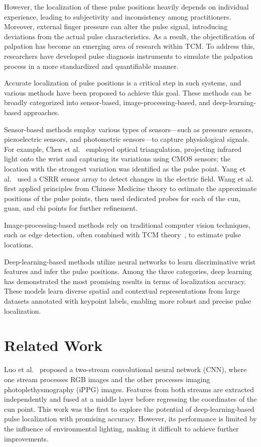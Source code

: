 \documentclass[twocolumn]{article}
\begin{document}
However, the localization of these pulse positions heavily depends on individual experience, leading to subjectivity and inconsistency among practitioners. Moreover, external finger pressure can alter the pulse signal, introducing deviations from the actual pulse characteristics. As a result, the objectification of palpation has become an emerging area of research within TCM. To address this, researchers have developed pulse diagnosis instruments to simulate the palpation process in a more standardized and quantifiable manner.

Accurate localization of pulse positions is a critical step in such systems, and various methods have been proposed to achieve this goal. These methods can be broadly categorized into sensor-based, image-processing-based, and deep-learning-based approaches.

Sensor-based methods employ various types of sensors—such as pressure sensors, piezoelectric sensors, and photometric sensors—to capture physiological signals. For example, Chen et al.~\cite{chen2015} employed optical triangulation, projecting infrared light onto the wrist and capturing its variations using CMOS sensors; the location with the strongest variation was identified as the pulse point. Yang et al.~\cite{yang2017} used a CSRR sensor array to detect changes in the electric field. Wang et al.~\cite{wang2014} first applied principles from Chinese Medicine theory to estimate the approximate positions of the pulse points, then used dedicated probes for each of the cun, guan, and chi points for further refinement.

Image-processing-based methods rely on traditional computer vision techniques, such as edge detection, often combined with TCM theory~\cite{geng2020}, to estimate pulse locations.

Deep-learning-based methods utilize neural networks to learn discriminative wrist features and infer the pulse positions. Among the three categories, deep learning has demonstrated the most promising results in terms of localization accuracy. These models learn diverse spatial and contextual representations from large datasets annotated with keypoint labels, enabling more robust and precise pulse localization.

\section{Related Work}
Luo et al.~\cite{luo2019} proposed a two-stream convolutional neural network (CNN), where one stream processes RGB images and the other processes imaging photoplethysmography (iPPG) images. Features from both streams are extracted independently and fused at a middle layer before regressing the coordinates of the cun point. This work was the first to explore the potential of deep-learning-based pulse localization with promising accuracy. However, its performance is limited by the influence of environmental lighting, making it difficult to achieve further improvements.
\end{document}
